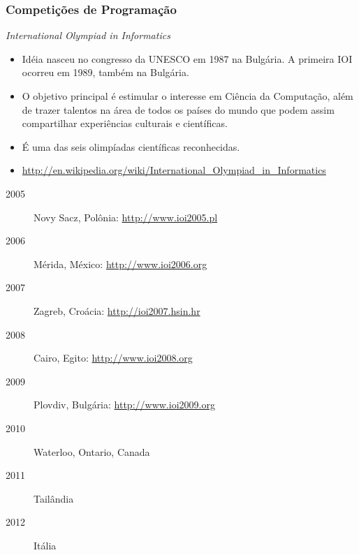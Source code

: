 \begin{frame}
 \frametitle{Competições de Programação}
 \begin{block}{\em International Olympiad in Informatics}
  \begin{overprint}
   \begin{itemize}
    \item Idéia nasceu no congresso da UNESCO em 1987 na Bulgária. A primeira IOI ocorreu em 1989, também na Bulgária.
    \item O objetivo principal é estimular o interesse em Ciência da Computação, além de trazer talentos na área de todos os países do mundo que podem assim compartilhar experiências culturais e científicas.
    \item É uma das seis olimpíadas científicas reconhecidas.
    \item \url{http://en.wikipedia.org/wiki/International_Olympiad_in_Informatics}
   \end{itemize}
   \begin{description}
    \item [2005] Novy Sacz, Polônia: \url{http://www.ioi2005.pl}
    \item [2006] Mérida, México: \url{http://www.ioi2006.org}
    \item [2007] Zagreb, Croácia: \url{http://ioi2007.hsin.hr}
    \item [2008] Cairo, Egito: \url{http://www.ioi2008.org}
    \item [2009] Plovdiv, Bulgária: \url{http://www.ioi2009.org}
    \item [2010] Waterloo, Ontario, Canada
    \item [2011] Tailândia
    \item [2012] Itália
   \end{description}
  \end{overprint}
 \end{block}
\end{frame}
